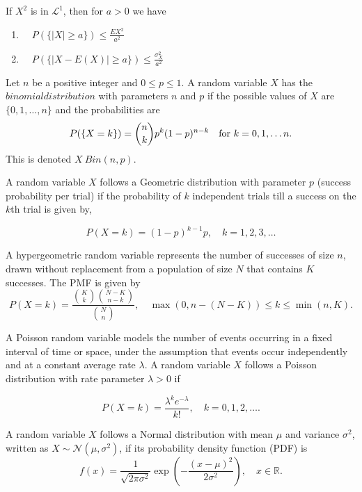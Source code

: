 \documentclass[../main.tex]{subfiles}
\begin{document}
\begin{corollary}
If $X^2$ is in $\mathcal{L}^1$, then for $a>0$ we have
\begin{enumerate}
    \item $ \quad P(\{|X| \geq a\}) \leq \frac{E{X^2}}{a^2}$
    \item $ \quad P(\{|X - E(X)| \geq a\}) \leq \frac{\sigma^2_X}{a^2}$
\end{enumerate}

\end{corollary}


\begin{definition}
Let $n$ be a positive integer and $ 0 \leq p \leq 1$. A random variable $X$ has the $binomial distribution$ with parameters
$n$ and $p$ if the possible values of $X$ are $\{0,1,\dots,n\}$ and the probabilities are 
\[
P(\{X=k\}) = \binom{n}{k}p^k(1-p)^{n-k} \quad \textnormal{for } k = 0,1,\dots n.
\]
This is denoted $X ~ Bin(n,p)$.
    
\end{definition}


\begin{definition}
A random variable \( X \) follows a Geometric distribution with parameter \( p \) (success probability per trial) if the probability of $k$ independent trials till a success on the $k$th trial is given by,

\[
P(X = k) = (1 - p)^{k-1} p, \quad k = 1, 2, 3, \dots
\]
\end{definition}


\begin{definition}
A hypergeometric random variable represents the number of successes of size $n$, drawn without replacement from a population of size \( N \) that contains \( K \) successes. The PMF is given by
\[
P(X = k) = \frac{\binom{K}{k} \binom{N - K}{n - k}}{\binom{N}{n}}, \quad \max(0, n - (N - K)) \leq k \leq \min(n, K).
\]

\end{definition}

\begin{definition}
A Poisson random variable models the number of events occurring in a fixed interval of time or space, under the assumption that events occur independently and at a constant average rate \( \lambda \).
A random variable \( X \) follows a Poisson distribution with rate parameter \( \lambda > 0 \) if

\[
P(X = k) = \frac{\lambda^k e^{-\lambda}}{k!}, \quad k = 0, 1, 2, \dots.
\]


\end{definition}


\begin{definition}
A random variable \( X \) follows a Normal distribution with mean \( \mu \) and variance \( \sigma^2 \), written as \( X \sim \mathcal{N}(\mu, \sigma^2) \), if its probability density function (PDF) is
\[
f(x) = \frac{1}{\sqrt{2\pi\sigma^2}} \exp \left( -\frac{(x - \mu)^2}{2\sigma^2} \right), \quad x \in \mathbb{R}.
\]
\end{definition}
\end{document}
